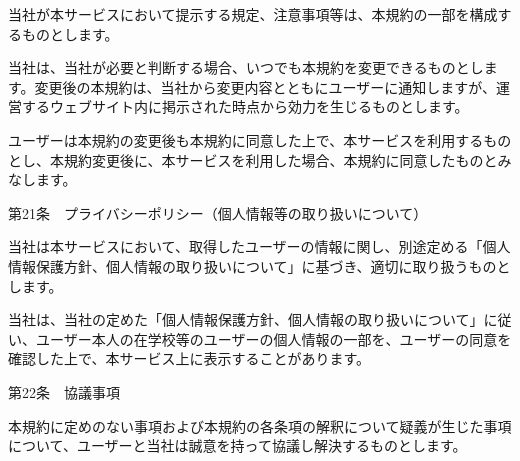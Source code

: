     当社が本サービスにおいて提示する規定、注意事項等は、本規約の一部を構成するものとします。

    当社は、当社が必要と判断する場合、いつでも本規約を変更できるものとします。変更後の本規約は、当社から変更内容とともにユーザーに通知しますが、運営するウェブサイト内に掲示された時点から効力を生じるものとします。

    ユーザーは本規約の変更後も本規約に同意した上で、本サービスを利用するものとし、本規約変更後に、本サービスを利用した場合、本規約に同意したものとみなします。

第21条　プライバシーポリシー（個人情報等の取り扱いについて）

    当社は本サービスにおいて、取得したユーザーの情報に関し、別途定める「個人情報保護方針、個人情報の取り扱いについて」に基づき、適切に取り扱うものとします。

    当社は、当社の定めた「個人情報保護方針、個人情報の取り扱いについて」に従い、ユーザー本人の在学校等のユーザーの個人情報の一部を、ユーザーの同意を確認した上で、本サービス上に表示することがあります。

第22条　協議事項

    本規約に定めのない事項および本規約の各条項の解釈について疑義が生じた事項について、ユーザーと当社は誠意を持って協議し解決するものとします。
